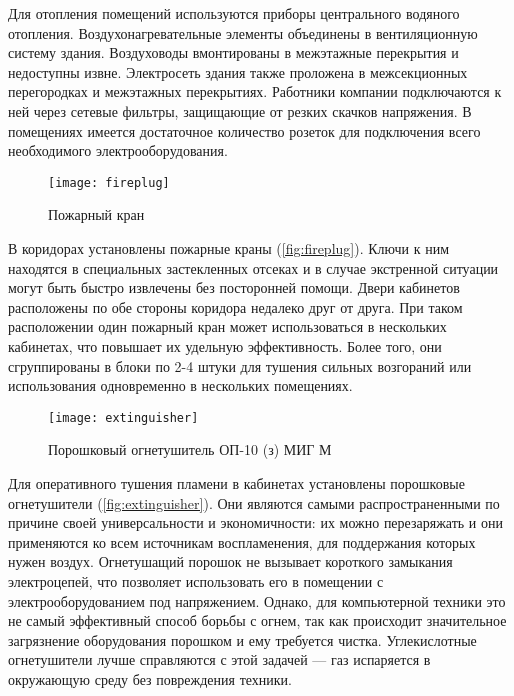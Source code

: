 Для отопления помещений используются приборы центрального водяного отопления. Воздухонагревательные элементы объединены в вентиляционную систему здания. Воздуховоды вмонтированы в межэтажные перекрытия и недоступны извне. Электросеть здания также проложена в межсекционных перегородках и межэтажных перекрытиях. Работники компании подключаются к ней через сетевые фильтры, защищающие от резких скачков напряжения. В помещениях имеется достаточное количество розеток для подключения всего необходимого электрооборудования.

\begin{figure}
  \begin{center}
    \texttt{[image: fireplug]}
    \caption{Пожарный кран}
    \label{fig:fireplug}
  \end{center}
\end{figure}

В коридорах установлены пожарные краны (\autoref{fig:fireplug}). Ключи к ним находятся в специальных застекленных отсеках и в случае экстренной ситуации могут быть быстро извлечены без посторонней помощи. Двери кабинетов расположены по обе стороны коридора недалеко друг от друга. При таком расположении один пожарный кран может использоваться в нескольких кабинетах, что повышает их удельную эффективность. Более того, они сгруппированы в блоки по 2-4 штуки для тушения сильных возгораний или использования одновременно в нескольких помещениях.

\begin{figure}
  \begin{center}
    \texttt{[image: extinguisher]}
    \caption{Порошковый огнетушитель \mbox{ОП-10} (з) МИГ М}
    \label{fig:extinguisher}
  \end{center}
\end{figure}

Для оперативного тушения пламени в кабинетах установлены порошковые огнетушители (\autoref{fig:extinguisher}). Они являются самыми распространенными по причине своей универсальности и экономичности: их можно перезаряжать и они применяются ко всем источникам воспламенения, для поддержания которых нужен воздух. Огнетушащий порошок не вызывает короткого замыкания электроцепей, что позволяет использовать его в помещении с электрооборудованием под напряжением. Однако, для компьютерной техники это не самый эффективный способ борьбы с огнем, так как происходит значительное загрязнение оборудования порошком и ему требуется чистка. Углекислотные огнетушители лучше справляются с этой задачей --- газ испаряется в окружающую среду без повреждения техники. \cite{extinguisher_comparison}

